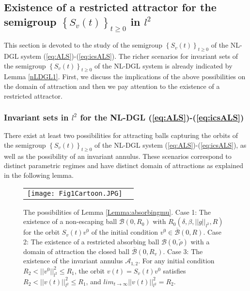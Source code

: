 \documentclass[preprintnumbers,amsmath,amssymb]{revtex4}
\begin{document}
\subsection{Existence of a restricted attractor for the semigroup   $\left\{S_v(t)\right\}_{t\ge 0}$ in $l^2$}
This section is devoted to the study of the semigroup $\left\{S_v(t)\right\}_{t\ge 0}$ of the NL-DGL system (\ref{eq:ALS})-(\ref{eq:icsALS}). The richer scenarios for invariant sets of the semigroup $\left\{S_v(t)\right\}_{t\ge 0}$ of the NL-DGL system  is already indicated by Lemma \ref{nLDGL1}. First, we discuss the implications of the  above possibilities on the domain of attraction and then we pay attention to the existence of a restricted attractor. 



\subsubsection{Invariant sets in $l^2$ for the NL-DGL (\ref{eq:ALS})-(\ref{eq:icsALS})}
%
There exist at least two possibilities for attracting balls capturing the orbits of the semigroup  $\left\{S_v(t)\right\}_{t\ge 0}$ of the NL-DGL system (\ref{eq:ALS})-(\ref{eq:icsALS}), as well as the possibility of an invariant annulus. These scenarios correspond to distinct parametric regimes and have distinct domain of attractions as explained in the following lemma. 
% 
%
\begin{figure}[tbp!]
	\begin{center}
		\begin{tabular}{cc}
			\texttt{[image: Fig1Cartoon.JPG]}			
		\end{tabular}
	\end{center}
	\caption{The possibilities of Lemma \ref{Lemma:absorbingmu}. Case 1: The existence of a non-escaping ball $\mathcal{B}(0,R_0)$ with  $R_0(\delta, \beta, ||g||_{l^2}, R)$ for the orbit $S_v(t)v^0$ of the initial condition $v^0\in \overline{\mathcal{B}}(0,R)$. Case 2: The existence of a restricted absorbing ball $\mathcal{B}(0,\tilde{\rho})$ with a domain of attraction the closed ball $\overline{\mathcal{B}}(0,R_v)$. Case 3: The existence of the invariant annulus $\mathcal{A}_{1,2}$. For any initial condition $R_2<||v^0||_{l^2}^2\leq	R_1$, the orbit $v(t)=S_v(t)v^0$ satisfies $R_2<||v(t)||_{l^2}^2\leq	R_1$, and $lim_{t\rightarrow\infty}||v(t)||_{l^2}^2=R_2$. }
	\label{fig1}
\end{figure}
%
\end{document}

